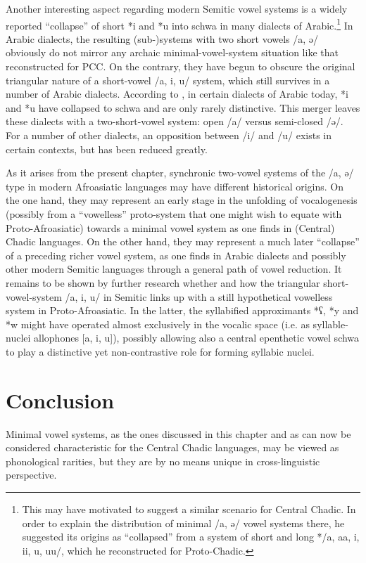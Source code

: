\documentclass[output=paper]{langscibook}
\begin{document}
Another interesting aspect regarding modern Semitic vowel systems is a widely reported ``collapse'' of short *i and *u into schwa in many dialects of Arabic.\footnote{This may have motivated \citet[193]{Newman2006} to suggest a similar scenario for Central Chadic. In order to explain the distribution of minimal /a, ə/ vowel systems there, he suggested its origins as ``collapsed'' from a system of short and long */a, aa, i, ii, u, uu/, which he reconstructed for Proto-Chadic.}  In Arabic dialects, the resulting (sub-)systems with two short vowels /a, ə/ obviously do not mirror any archaic minimal-vowel-system situation like that reconstructed for PCC. On the contrary, they have begun to obscure the original triangular nature of a short-vowel /a, i, u/ system, which still survives in a number of Arabic dialects. According to \cite[21]{Watson2002}, in certain dialects of Arabic today, *{i} and *{u} have collapsed to schwa and are only rarely distinctive. This merger leaves these dialects with a two-short-vowel system: open /a/ versus semi-closed /ə/. For a number of other dialects, an opposition between /i/ and \mbox{/u/} exists in certain contexts, but has been reduced greatly.

As it arises from the present chapter, synchronic two-vowel systems of the /a, ə/ type in modern Afroasiatic languages may have different historical origins. On the one hand, they may represent an early stage in the unfolding of vocalogenesis (possibly from a ``vowelless'' proto-system that one might wish to equate with Proto-Afroasiatic) towards a minimal vowel system as one finds in (Central) Chadic languages. On the other hand, they may represent a much later ``collapse'' of a preceding richer vowel system, as one finds in Arabic dialects and possibly other modern Semitic languages through a general path of vowel reduction. It remains to be shown by further research whether and how the triangular short-vowel-system /a, i, u/ in Semitic links up with a still hypothetical vowelless system in Proto-Afroasiatic. In the latter, the syllabified approximants *ʕ, *y and *w might have operated almost exclusively in the vocalic space (i.e. as syllable-nuclei allophones [a, i, u]), possibly allowing also a central epenthetic vowel schwa to play a distinctive yet non-contrastive role for forming syllabic nuclei.

\section{Conclusion}
\label{sec:Wolff:4}
Minimal vowel systems, as the ones discussed in this chapter and as can now be considered characteristic for the Central Chadic languages, may be viewed as phonological rarities, but they are by no means unique in cross-linguistic perspective. 
\end{document}
